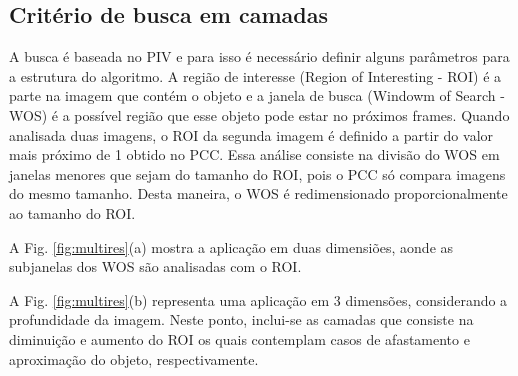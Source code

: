 \subsection{Critério de busca em camadas}

A busca é baseada no PIV e para isso é necessário definir alguns parâmetros para a estrutura 
do algoritmo. A região de interesse (Region of Interesting - ROI) é a parte na imagem que contém
o objeto e a janela de busca (Windowm of Search - WOS) é a possível região que esse objeto pode estar
no próximos frames. Quando analisada duas imagens, o ROI da segunda imagem é definido a partir do
valor mais próximo de 1 obtido no PCC. 
Essa análise consiste na divisão do WOS em janelas menores que sejam do tamanho do ROI, pois o PCC
só compara imagens do mesmo tamanho. Desta maneira, o WOS é redimensionado proporcionalmente ao 
tamanho do ROI.

A Fig. \ref{fig:multires}(a) mostra a aplicação em duas dimensiões, aonde as subjanelas dos WOS
são analisadas com o ROI. 

A Fig. \ref{fig:multires}(b) representa uma aplicação em 3 dimensões, considerando a profundidade
da imagem. Neste ponto, inclui-se as camadas que consiste na diminuição e aumento do ROI os quais 
contemplam casos de afastamento e aproximação do objeto, respectivamente.

